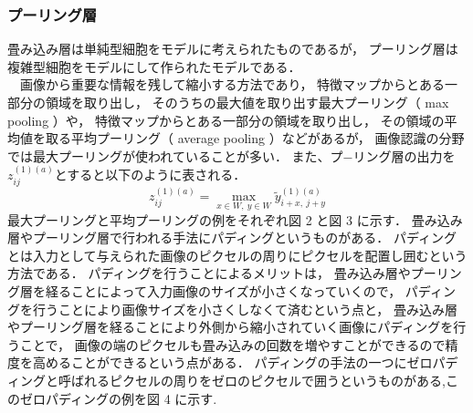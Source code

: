 \subsubsection{プーリング層}
畳み込み層は単純型細胞をモデルに考えられたものであるが，
プーリング層は複雑型細胞をモデルにして作られたモデルである．\\
　画像から重要な情報を残して縮小する方法であり，
特徴マップからとある一部分の領域を取り出し，
そのうちの最大値を取り出す最大プーリング（ max pooling ）や，
特徴マップからとある一部分の領域を取り出し，
その領域の平均値を取る平均プーリング（ average pooling ）などがあるが，
画像認識の分野では最大プーリングが使われていることが多い．
また、プ−リング層の出力を$z^{(1)(a)}_{ij}$とすると以下のように表される．
\begin{equation}
  z_{ij}^{(1)(a)} = \max_{x \in W,\ y\in W} \tilde{y}_{i + x,\ j + y}^{(1)(a)}
  \label{eq:Pooling}
\end{equation}
最大プーリングと平均プーリングの例をそれぞれ図 2 と図 3 に示す．
畳み込み層やプーリング層で行われる手法にパディングというものがある．
パディングとは入力として与えられた画像のピクセルの周りにピクセルを配置し囲むという方法である．
パディングを行うことによるメリットは，
畳み込み層やプーリング層を経ることによって入力画像のサイズが小さくなっていくので，
パディングを行うことにより画像サイズを小さくしなくて済むという点と，
畳み込み層やプーリング層を経ることにより外側から縮小されていく画像にパディングを行うことで，
画像の端のピクセルも畳み込みの回数を増やすことができるので精度を高めることができるという点がある．
パディングの手法の一つにゼロパディングと呼ばれるピクセルの周りをゼロのピクセルで囲うというものがある,このゼロパディングの例を図 4 に示す.
